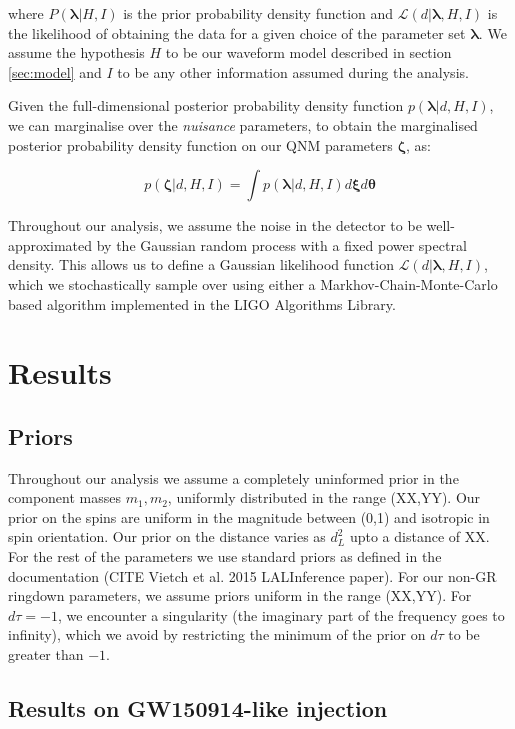 \documentclass[twocolumn,prd,superscriptaddress,amsfonts,amssymb,amsmath,preprintnumbers]{revtex4-1}
\newcommand{\blambda}{\bm{\lambda}}
\newcommand{\btheta}{\bm{\theta}}
\newcommand{\bxi}{\bm{\xi}}
\newcommand{\bzeta}{\bm{\zeta}}
\begin{document}
where $P(\blambda | H,I)$ is the prior probability density function and $\mathcal{L}(d | \blambda, H, I)$ is the likelihood of obtaining the data for a given choice of the parameter set $\blambda$. We assume the hypothesis $H$ to be our waveform model described in section \ref{sec:model} and $I$ to be any other information assumed during the analysis.

Given the full-dimensional posterior probability density function $p(\blambda | d, H, I)$, we can marginalise over the \emph{nuisance} parameters, to obtain the marginalised posterior probability density function on our QNM parameters $\bzeta$, as:

\begin{equation}
p(\bzeta | d, H, I) = \int p(\blambda | d, H, I) d\bxi d\btheta
\end{equation}

Throughout our analysis, we assume the noise in the detector to be well-approximated by the Gaussian random process with a fixed power spectral density. This allows us to define a Gaussian likelihood function $\mathcal{L}(d | \blambda, H, I)$, which we stochastically sample over using either a Markhov-Chain-Monte-Carlo based algorithm implemented in the LIGO Algorithms Library.

\section{Results}\label{sec:results}
\subsection{Priors}

Throughout our analysis we assume a completely uninformed prior in the component masses $m_1, m_2$, uniformly distributed in the range (XX,YY). Our prior on the spins are uniform in the magnitude between (0,1) and isotropic in spin orientation. Our prior on the distance varies as $d_L^2$ upto a distance of XX. For the rest of the parameters we use standard priors as defined in the documentation (CITE Vietch et al. 2015 LALInference paper). For our non-GR ringdown parameters, we assume priors uniform in the range (XX,YY). For $d\tau = -1$, we encounter a singularity (the imaginary part of the frequency goes to infinity), which we avoid by restricting the minimum of the prior on $d\tau$ to be greater than $-1$.

\subsection{Results on GW150914-like injection}
\end{document}
